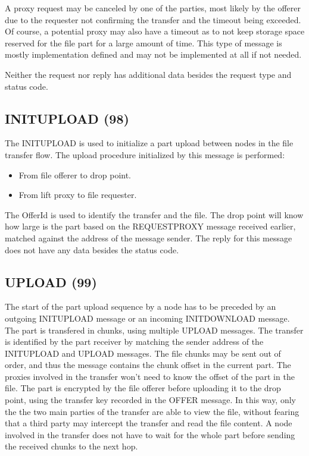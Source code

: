 A proxy request may be canceled by one of the parties, most likely by the
offerer due to the requester not confirming the transfer and the timeout being
exceeded. Of course, a potential proxy may also have a timeout as to not keep
storage space reserved for the file part for a large amount of time. This
type of message is mostly implementation defined and may not be implemented at
all if not needed.

Neither the request nor reply has additional data besides the request type and
status code.

\subsection{INITUPLOAD (98)}

The INITUPLOAD is used to initialize a part upload between nodes in the file
transfer flow. The upload procedure initialized by this message is performed:
\begin{itemize}
    \item From file offerer to drop point.
    \item From lift proxy to file requester.
\end{itemize}

The OfferId is used to identify the transfer and the file. The drop point will
know how large is the part based on the REQUESTPROXY message received earlier,
matched against the address of the message sender. The reply for this message
does not have any data besides the status code.

\begin{figure}[H]
    \centering
\end{figure}

\subsection{UPLOAD (99)}

The start of the part upload sequence by a node has to be preceded by an
outgoing INITUPLOAD message or an incoming INITDOWNLOAD message. The part is
transfered in chunks, using multiple UPLOAD messages. The transfer is
identified by the part receiver by matching the sender address of the
INITUPLOAD and UPLOAD messages. The file chunks may be sent out of order, and
thus the message contains the chunk offset in the current part. The proxies
involved in the transfer won't need to know the offset of the part in the file.
The part is encrypted by the file offerer before uploading it to the drop
point, using the transfer key recorded in the OFFER message. In this way, only
the the two main parties of the transfer are able to view the file, without
fearing that a third party may intercept the transfer and read the file content.
A node involved in the transfer does not have to wait for the whole part before
sending the received chunks to the next hop.


